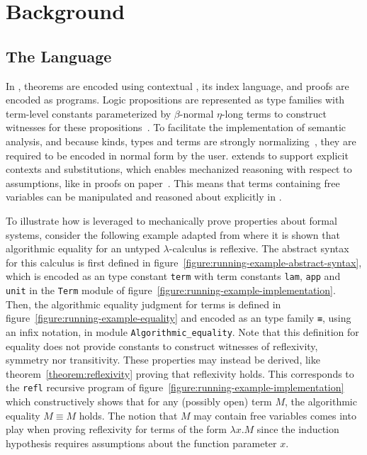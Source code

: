\chapter{Background}

\section{The \Beluga Language}

In \Beluga, theorems are encoded using contextual \LF, its index language, and proofs are encoded as programs.
Logic propositions are represented as \LF type families with term-level constants parameterized by $\beta$-normal $\eta$-long \LF terms to construct witnesses for these propositions~\cite{nanevski2008contextual, foundation2008pientka, DBLP:journals/corr/abs-1009-2789}.
To facilitate the implementation of semantic analysis, and because \LF kinds, types and terms are strongly normalizing~\cite{harper1993framework}, they are required to be encoded in normal form by the user.
\Beluga extends \LF to support explicit contexts and substitutions, which enables mechanized reasoning with respect to assumptions, like in proofs on paper~\cite{pientka2010programming}.
This means that terms containing free variables can be manipulated and reasoned about explicitly in \Beluga.

To illustrate how \Beluga is leveraged to mechanically prove properties about formal systems, consider the following example adapted from \cite{felty2010reasoning} where it is shown that algorithmic equality for an untyped $\lambda$-calculus is reflexive.
The abstract syntax for this calculus is first defined in figure~\ref{figure:running-example-abstract-syntax}, which is encoded as an \LF type constant \verb|term| with term constants \verb|lam|, \verb|app| and \verb|unit| in the \verb|Term| module of figure~\ref{figure:running-example-implementation}.
Then, the algorithmic equality judgment for terms is defined in figure~\ref{figure:running-example-equality} and encoded as an \LF type family \verb|≡|, using an infix notation, in module \verb|Algorithmic_equality|.
Note that this definition for equality does not provide constants to construct witnesses of reflexivity, symmetry nor transitivity.
These properties may instead be derived, like theorem~\ref{theorem:reflexivity} proving that reflexivity holds.
This corresponds to the \verb|refl| recursive program of figure~\ref{figure:running-example-implementation} which constructively shows that for any (possibly open) term $M$, the algorithmic equality $M \equiv M$ holds.
The notion that $M$ may contain free variables comes into play when proving reflexivity for terms of the form $\lambda x. M$ since the induction hypothesis requires assumptions about the function parameter $x$.


